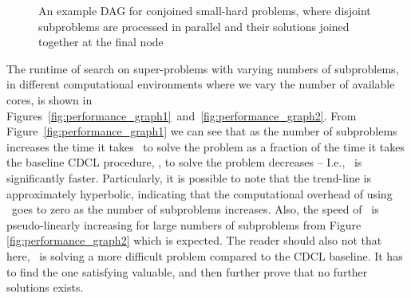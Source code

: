 \documentclass[
10pt, %
a4paper, %
oneside, %
headinclude,footinclude, %
BCOR5mm, %
]{scrartcl}
\begin{document}
\begin{figure}[h]
\centering
{}
\caption[An example DAG for conjoined small-hard problems]{An example DAG for conjoined small-hard problems, where disjoint subproblems are processed in parallel and their solutions joined together at the final node}\label{fig:dag_example4315}
\end{figure}


The runtime of search on  super-problems with varying numbers of subproblems, in different computational environments where we vary the number of available cores, is shown in Figures~\ref{fig:performance_graph1}~and~\ref{fig:performance_graph2}.
From Figure~\ref{fig:performance_graph1} we can see that as the number of subproblems increases the time it takes \dagster\ to solve the problem as a fraction of the time it takes the baseline CDCL procedure, \tinisat, to solve the problem decreases -- I.e., \dagster\ is significantly faster.
Particularly, it is possible to note that the trend-line is approximately hyperbolic, indicating that the computational overhead of using \dagster\ goes to zero as the number of subproblems increases.
Also, the speed of \dagster\ is pseudo-linearly increasing for large numbers of subproblems from Figure \ref{fig:performance_graph2} which is expected.
The reader should also not that here, \dagster\ is solving a more difficult problem compared to the CDCL baseline.
It has to find the one satisfying valuable, and then further prove that no further solutions exists.
\end{document}
